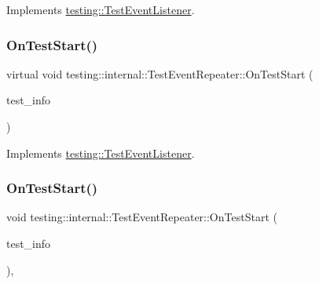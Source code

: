 Implements \mbox{\hyperlink{classtesting_1_1_test_event_listener_a5f6c84f39851e8a603a2d2e10063816b}{testing\+::\+Test\+Event\+Listener}}.

\mbox{\label{classtesting_1_1internal_1_1_test_event_repeater_a70d694ca5010cc86cd458f7f529e6fbe}} 
\subsubsection{\texorpdfstring{OnTestStart()}{OnTestStart()}\hspace{0.1cm}{\footnotesize\ttfamily [1/3]}}
{\footnotesize\ttfamily virtual void testing\+::internal\+::\+Test\+Event\+Repeater\+::\+On\+Test\+Start (\begin{DoxyParamCaption}\item[{const \mbox{\hyperlink{classtesting_1_1_test_info}{Test\+Info}} \&}]{test\+\_\+info }\end{DoxyParamCaption})\hspace{0.3cm}{\ttfamily [virtual]}}



Implements \mbox{\hyperlink{classtesting_1_1_test_event_listener_ab4f6a0ca16ae75daf385b3b5914e1048}{testing\+::\+Test\+Event\+Listener}}.

\mbox{\label{classtesting_1_1internal_1_1_test_event_repeater_a4522c01f10f98d9e5bd97c7e94f3d2bf}} 
\subsubsection{\texorpdfstring{OnTestStart()}{OnTestStart()}\hspace{0.1cm}{\footnotesize\ttfamily [2/3]}}
{\footnotesize\ttfamily void testing\+::internal\+::\+Test\+Event\+Repeater\+::\+On\+Test\+Start (\begin{DoxyParamCaption}\item[{const \mbox{\hyperlink{classtesting_1_1_test_info}{Test\+Info}} \&}]{test\+\_\+info }\end{DoxyParamCaption})\hspace{0.3cm}{\ttfamily [override]}, {\ttfamily [virtual]}}




